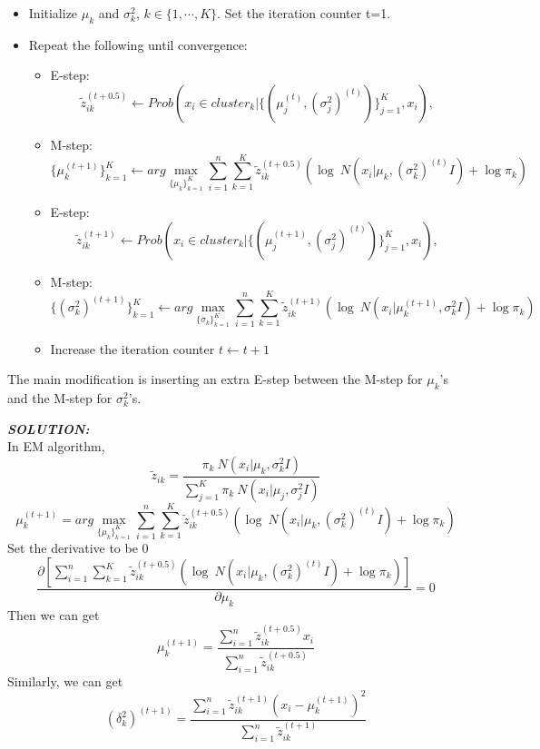 \documentclass{article}
\theoremstyle{definition}
\theoremstyle{definition}
\theoremstyle{remark}
\begin{document}
\begin{itemize}
  \item Initialize $\mu_k$ and $\sigma_k^2$, $k \in \{1,\cdots ,K\}$. Set the iteration counter t=1.
  \item Repeat the following until convergence:
  \begin{itemize}
    \item E-step:
    \[
    \tilde{z}_{ik}^{(t+0.5)} \leftarrow Prob\left(x_i\in cluster_k | \{(\mu_j^{(t)},(\sigma_j^2)^{(t)})\}_{j=1}^K,x_i\right),
    \]
    \item M-step:
    \[
    \{\mu_k^{(t+1)}\}_{k=1}^K \leftarrow arg\max_{\{\mu_k\}_{k=1}^K} \sum_{i=1}^n\sum_{k=1}^K \tilde{z}_{ik}^{(t+0.5)} \left(\log~N(x_i|\mu_k,(\sigma_k^2)^{(t)}I)+\log\pi_k\right)
    \]
    \item E-step:
    \[
    \tilde{z}_{ik}^{(t+1)} \leftarrow Prob\left(x_i \in cluster_k|\{(\mu_j^{(t+1)},(\sigma_j^2)^{(t)})\}_{j=1}^K,x_i\right),
    \]
    \item M-step:
    \[
    \{(\sigma_k^2)^{(t+1)}\}_{k=1}^K \leftarrow arg \max_{\{\sigma_k\}_{k=1}^K} \sum_{i=1}^n \sum_{k=1}^K \tilde{z}_{ik}^{(t+1)} \left(\log~N(x_i|\mu_k^{(t+1)},\sigma_k^2 I)+\log \pi_k \right)
    \]
    \item Increase the iteration counter $t\leftarrow t+1$
  \end{itemize}
\end{itemize}
The main modification is inserting an extra E-step between the M-step for $\mu_k$'s and the M-step for $\sigma_k^2$'s.

\emph{\textbf{SOLUTION:}}\\
In EM algorithm,
\[
\tilde{z}_{ik} = \frac{\pi_k~N(x_i|\mu_k,\sigma_k^2I)}{\sum_{j=1}^K\pi_k~N(x_i|\mu_j,\sigma_j^2I)}
\]
\begin{equation}\nonumber
\mu_k^{(t+1)} = arg\max_{\{\mu_k\}_{k=1}^K} \sum_{i=1}^n\sum_{k=1}^K \tilde{z}_{ik}^{(t+0.5)} \left(\log~N(x_i|\mu_k,(\sigma_k^2)^{(t)}I)+\log\pi_k\right)
\end{equation}
Set the derivative to be 0
\begin{equation}\nonumber
\frac{\partial\left[ \sum_{i=1}^n\sum_{k=1}^K \tilde{z}_{ik}^{(t+0.5)} \left(\log~N(x_i|\mu_k,(\sigma_k^2)^{(t)}I)+\log\pi_k\right)\right]}{\partial \mu_k} = 0
\end{equation}
Then we can get
\begin{equation}\nonumber
\mu_k^{(t+1)} = \frac{\sum_{i=1}^n \tilde{z}_{ik}^{(t+0.5)}x_i}{\sum_{i=1}^n \tilde{z}_{ik}^{(t+0.5)}}
\end{equation}
Similarly, we can get
\begin{equation}\nonumber
(\delta_k^2)^{(t+1)} = \frac{\sum_{i=1}^n \tilde{z}_{ik}^{(t+1)}(x_i-\mu_k^{(t+1)})^2}{\sum_{i=1}^n \tilde{z}_{ik}^{(t+1)}}
\end{equation}
\end{document}

